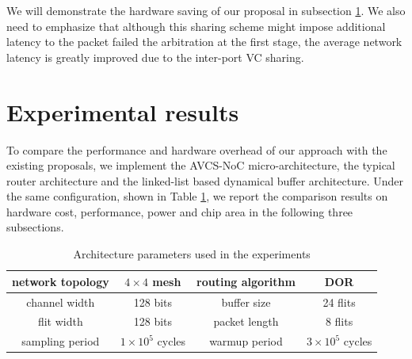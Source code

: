 \documentclass[10pt,conference]{IEEEtran}
\begin{document}
We will demonstrate the hardware saving of our proposal in subsection \ref{experiemnts}. We also need to emphasize that although this sharing scheme might impose additional latency to the packet failed the arbitration at the first stage, the average network latency is greatly improved due to the inter-port VC sharing.

\section{Experimental results}\label{experiemnts}
To compare the performance and hardware overhead of our approach with the existing proposals, we implement the AVCS-NoC micro-architecture, the typical router architecture and the linked-list based dynamical buffer architecture. Under the same configuration, shown in Table \ref{config}, we report the comparison results on hardware cost, performance, power and chip area in the following three subsections.

\begin{table}[htbp]
\centering
\caption{\label{arcpara}Architecture parameters used in the experiments}\label{config}
\begin{tabular}{|c|c||c|c|}
\hline
network topology    & $4\times 4$ mesh  &   routing algorithm & DOR\\
\hline
channel width   & 128 bits & buffer size &   24 flits\\
\hline
flit width	& 128 bits & packet length & 8 flits\\
\hline
sampling period &   $1\times 10^5$ cycles    &   warmup period   &   $3\times 10^5$ cycles\\
\hline
\end{tabular}
\end{table}
\end{document}
